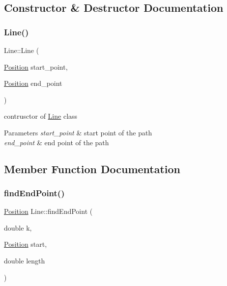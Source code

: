 \subsection{Constructor \& Destructor Documentation}
\mbox{\label{class_line_a123e1da8ef560bac5ab6b643e25c3d8f}} 
\subsubsection{\texorpdfstring{Line()}{Line()}}
{\footnotesize\ttfamily Line\+::\+Line (\begin{DoxyParamCaption}\item[{\mbox{\hyperlink{class_position}{Position}}}]{start\+\_\+point,  }\item[{\mbox{\hyperlink{class_position}{Position}}}]{end\+\_\+point }\end{DoxyParamCaption})}



contrusctor of \mbox{\hyperlink{class_line}{Line}} class 


\begin{DoxyParams}{Parameters}
{\em start\+\_\+point} & start point of the path \\
\hline
{\em end\+\_\+point} & end point of the path \\
\hline
\end{DoxyParams}


\subsection{Member Function Documentation}
\mbox{\label{class_line_ad19714c8b94997c96d35fefaa2bbda26}} 
\subsubsection{\texorpdfstring{find\+End\+Point()}{findEndPoint()}}
{\footnotesize\ttfamily \mbox{\hyperlink{class_position}{Position}} Line\+::find\+End\+Point (\begin{DoxyParamCaption}\item[{double}]{k,  }\item[{\mbox{\hyperlink{class_position}{Position}}}]{start,  }\item[{double}]{length }\end{DoxyParamCaption})}



